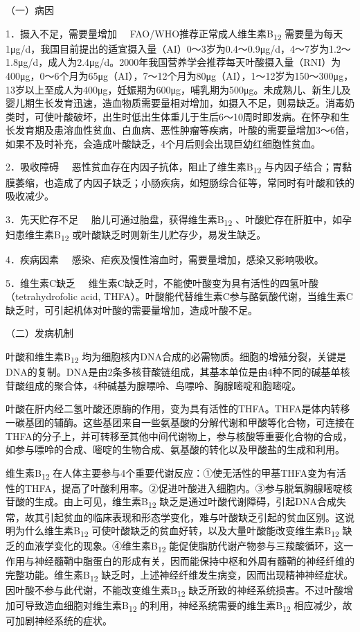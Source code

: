 （一）病因

{1．摄入不足，需要量增加} 　FAO/WHO推荐正常成人维生素B\textsubscript{12}
需要量为每天1μg/d，我国目前提出的适宜摄入量（AI）0～3岁为0.4～0.9μg/d，4～7岁为1.2～1.8μg/d，成人为2.4μg/d。2000年我国营养学会推荐每天叶酸摄入量（RNI）为400μg，0～6个月为65μg（AI），7～12个月为80μg（AI），1～12岁为150～300μg，13岁以上至成人为400μg，妊娠期为600μg，哺乳期为500μg。未成熟儿、新生儿及婴儿期生长发育迅速，造血物质需要量相对增加，如摄入不足，则易缺乏。消毒奶类时，可使叶酸破坏，出生时低出生体重儿于生后6～10周时即发病。在怀孕和生长发育期及患溶血性贫血、白血病、恶性肿瘤等疾病，叶酸的需要量增加3～6倍，如果不及时补充，会造成叶酸缺乏，4个月后则会出现巨幼红细胞性贫血。

{2．吸收障碍} 　恶性贫血存在内因子抗体，阻止了维生素B\textsubscript{12}
与内因子结合；胃黏膜萎缩，也造成了内因子缺乏；小肠疾病，如短肠综合征等，常同时有叶酸和铁的吸收减少。

{3．先天贮存不足} 　胎儿可通过胎盘，获得维生素B\textsubscript{12}
、叶酸贮存在肝脏中，如孕妇患维生素B\textsubscript{12}
或叶酸缺乏时则新生儿贮存少，易发生缺乏。

{4．疾病因素} 　感染、疟疾及慢性溶血时，需要量增加，感染又影响吸收。

{5．维生素C缺乏}
　维生素C缺乏时，不能使叶酸变为具有活性的四氢叶酸（tetrahydrofolic acid,
THFA）。叶酸能代替维生素C参与酪氨酸代谢，当维生素C缺乏时，可引起机体对叶酸的需要量增加，造成叶酸不足。

（二）发病机制

叶酸和维生素B\textsubscript{12}
均为细胞核内DNA合成的必需物质。细胞的增殖分裂，关键是DNA的复制。DNA是由2条多核苷酸链组成，其基本单位是由4种不同的碱基单核苷酸组成的聚合体，4种碱基为腺嘌呤、鸟嘌呤、胸腺嘧啶和胞嘧啶。

叶酸在肝内经二氢叶酸还原酶的作用，变为具有活性的THFA。THFA是体内转移一碳基团的辅酶。这些基团来自一些氨基酸的分解代谢和甲酸等化合物，可连接在THFA的分子上，并可转移至其他中间代谢物上，参与核酸等重要化合物的合成，如参与嘌呤的合成、嘧啶的生物合成、氨基酸的转化以及甲酸盐的生成和利用。

维生素B\textsubscript{12}
在人体主要参与4个重要代谢反应：①使无活性的甲基THFA变为有活性的THFA，提高了叶酸利用率。②促进叶酸进入细胞内。③参与脱氧胸腺嘧啶核苷酸的生成。由上可见，维生素B\textsubscript{12}
缺乏是通过叶酸代谢障碍，引起DNA合成失常，故其引起贫血的临床表现和形态学变化，难与叶酸缺乏引起的贫血区别。这说明为什么维生素B\textsubscript{12}
可使叶酸缺乏的贫血好转，以及大量叶酸能改变维生素B\textsubscript{12}
缺乏的血液学变化的现象。④维生素B\textsubscript{12}
能促使脂肪代谢产物参与三羧酸循环，这一作用与神经髓鞘中脂蛋白的形成有关，因而能保持中枢和外周有髓鞘的神经纤维的完整功能。维生素B\textsubscript{12}
缺乏时，上述神经纤维发生病变，因而出现精神神经症状。因叶酸不参与此代谢，不能改变维生素B\textsubscript{12}
缺乏所致的神经系统损害。不过叶酸增加可导致造血细胞对维生素B\textsubscript{12}
的利用，神经系统需要的维生素B\textsubscript{12}
相应减少，故可加剧神经系统的症状。

